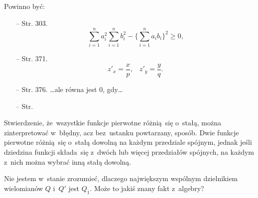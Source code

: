 \documentclass[a4paper,11pt]{article}
\begin{document}


Powinno być:
\begin{itemize}
\item[--] Str. 303.
  \[\sum_{ i = 1 }^{ n } a_{ i }^{2} \sum_{ i = 1 }^{ n } b_{ i }^{ 2
    } - \{ \sum_{ i = 1 }^{ n } a_{ i } b_{ i } \}^{ 2 } \geq 0
    \textrm{,}\]
\item[--] Str. 371.
  \[z'_{ x } = \frac{ x }{ p } \textrm{,} \quad z'_{ y } = \frac{ y }{
      q } \textrm{.}\]
\item[--] Str. 376. \ldots ale równa jest 0, gdy\ldots
\item[--] Str.
\end{itemize}

\vspace{\spaceTwo}










\start {} Stwierdzenie, że~wszystkie funkcje pierwotne różnią~się
o~stałą, można zinterpretować w~błędny, acz bez~ustanku powtarzany,
sposób. Dwie funkcje pierwotne różnią~się o~stałą dowolną na każdym
przedziale spójnym, jednak jeśli dziedzina funkcji składa~się z~dwóch
lub więcej przedziałów spójnych, na każdym z~nich można wybrać inną
stałą dowolną.

\vspace{\spaceFour}


\start {} Nie jestem w~stanie zrozumieć, dlaczego największym
wspólnym dzielnikiem wielomianów $Q$ i~$Q'$ jest $Q_{ 1 }$. Może to
jakiś znany fakt z~algebry? \Dok
\end{document}
